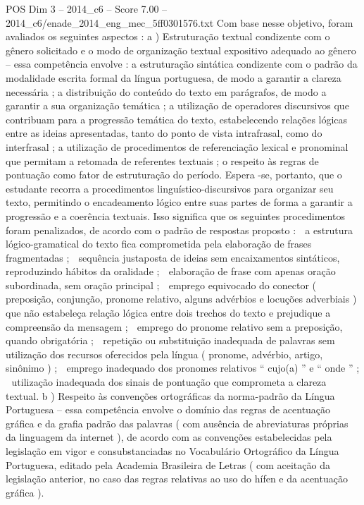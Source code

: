 \begin{textsample}{POS Dim 3 – 2014\_c6 – Score 7.00 – 2014\_c6/enade\_2014\_eng\_mec\_5ff0301576.txt}
Com base nesse objetivo, foram avaliados os seguintes aspectos : a ) Estruturação textual condizente com o gênero solicitado e o modo de organização textual expositivo adequado ao gênero – essa competência envolve : a estruturação sintática condizente com o padrão da modalidade escrita formal da língua portuguesa, de modo a garantir a clareza necessária ; a distribuição do conteúdo do texto em parágrafos, de modo a garantir a sua organização temática ; a utilização de operadores discursivos que contribuam para a progressão temática do texto, estabelecendo relações lógicas entre as ideias apresentadas, tanto do ponto de vista intrafrasal, como do interfrasal ; a utilização de procedimentos de referenciação lexical e pronominal que permitam a retomada de referentes textuais ; o respeito às regras de pontuação como fator de estruturação do período.
Espera -se, portanto, que o estudante recorra a procedimentos linguístico-discursivos para organizar seu texto, permitindo o encadeamento lógico entre suas partes de forma a garantir a progressão e a coerência textuais.
Isso significa que os seguintes procedimentos foram penalizados, de acordo com o padrão de respostas proposto :  a estrutura lógico-gramatical do texto fica comprometida pela elaboração de frases fragmentadas ;  sequência justaposta de ideias sem encaixamentos sintáticos, reproduzindo hábitos da oralidade ;  elaboração de frase com apenas oração subordinada, sem oração principal ;  emprego equivocado do conector ( preposição, conjunção, pronome relativo, alguns advérbios e locuções adverbiais ) que não estabeleça relação lógica entre dois trechos do texto e prejudique a compreensão da mensagem ;  emprego do pronome relativo sem a preposição, quando obrigatória ;  repetição ou substituição inadequada de palavras sem utilização dos recursos oferecidos pela língua ( pronome, advérbio, artigo, sinônimo ) ;  emprego inadequado dos pronomes relativos “ cujo(a) ” e “ onde ” ;  utilização inadequada dos sinais de pontuação que comprometa a clareza textual. b ) Respeito às convenções ortográficas da norma-padrão da Língua Portuguesa – essa competência envolve o domínio das regras de acentuação gráfica e da grafia padrão das palavras ( com ausência de abreviaturas próprias da linguagem da internet ), de acordo com as convenções estabelecidas pela legislação em vigor e consubstanciadas no Vocabulário Ortográfico da Língua Portuguesa, editado pela Academia Brasileira de Letras ( com aceitação da legislação anterior, no caso das regras relativas ao uso do hífen e da acentuação gráfica ).

\end{textsample}
